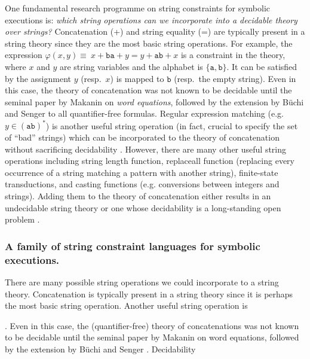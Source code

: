 One fundamental research programme on string constraints for symbolic executions
is:
\emph{which string operations can we
incorporate into a decidable theory over strings?}
Concatenation (+) and string equality (=) are typically present in a string 
theory since they are the most basic string operations. For example, the
expression $\varphi(x,y) \equiv\ x + \texttt{ba} + y = y + 
\texttt{ab} 
+ x$ is a constraint in the 
theory, where $x$ and $y$ are string variables and the alphabet is
$\{\texttt{a},\texttt{b}\}$.
It can be satisfied by the assignment $y$ (resp.~$x$) is mapped to $\texttt{b}$
(resp.~the empty string). Even in this case, the theory of concatenation was 
not known to be decidable until the seminal
paper by Makanin \cite{Makanin} on \emph{word equations}, followed by the
extension by B\"{u}chi and Senger \cite{buchi} to all quantifier-free formulas.
Regular expression matching (e.g. $y \in (\texttt{ab})^*$) is another useful
string operation (in fact, crucial to specify the set of ``bad'' strings) which
can be incorporated to the theory of concatenation without sacrificing
decidability \cite{Schulz}. 
However, there are many other useful string 
operations including string length function, replaceall
function (replacing every occurrence of a string matching a pattern with another
string), finite-state transductions, and casting functions (e.g. conversions
between integers and strings). Adding them to the theory of concatenation
either results in an undecidable string theory \cite{LB16,BFL13,GB16}
or one whose decidability is a long-standing open problem \cite{Vijay-length}.

\subsubsection*{A family of string constraint languages for symbolic executions.}
There are many possible string operations we could incorporate to a string 
theory.
Concatenation is typically present in a string theory since it is perhaps
the most basic string operation. Another useful string operation is 

. Even in this case, the (quantifier-free)
theory of concatenations was not known to be decidable until the seminal
paper by Makanin \cite{Makanin} on word equations, followed by the
extension by B\"{u}chi and Senger \cite{buchi}. Decidability 



